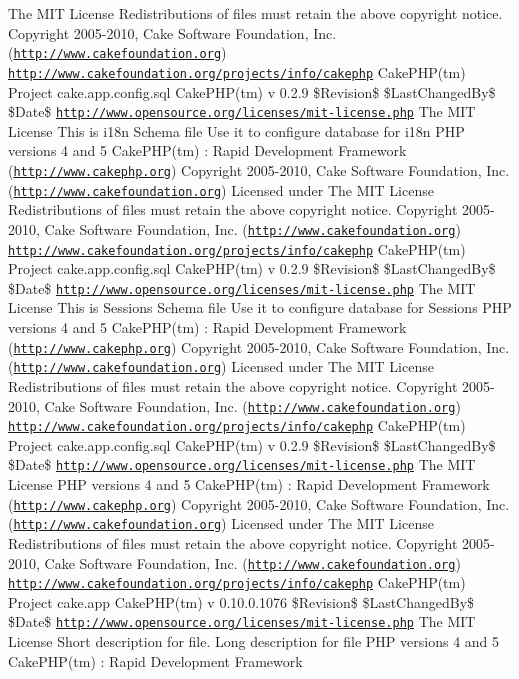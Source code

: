 The MIT License Redistributions of files must retain the above copyright notice.    Copyright 2005-\/2010, Cake Software Foundation, Inc. (\href{http://www.cakefoundation.org}{\tt http://www.cakefoundation.org})  \href{http://www.cakefoundation.org/projects/info/cakephp}{\tt http://www.cakefoundation.org/projects/info/cakephp} CakePHP(tm) Project   cake.app.config.sql  CakePHP(tm) v 0.2.9  \$Revision\$  \$LastChangedBy\$  \$Date\$  \href{http://www.opensource.org/licenses/mit-license.php}{\tt http://www.opensource.org/licenses/mit-\/license.php} The MIT License  This is i18n Schema file  Use it to configure database for i18n  PHP versions 4 and 5  CakePHP(tm) : Rapid Development Framework (\href{http://www.cakephp.org}{\tt http://www.cakephp.org}) Copyright 2005-\/2010, Cake Software Foundation, Inc. (\href{http://www.cakefoundation.org}{\tt http://www.cakefoundation.org})  Licensed under The MIT License Redistributions of files must retain the above copyright notice.    Copyright 2005-\/2010, Cake Software Foundation, Inc. (\href{http://www.cakefoundation.org}{\tt http://www.cakefoundation.org})  \href{http://www.cakefoundation.org/projects/info/cakephp}{\tt http://www.cakefoundation.org/projects/info/cakephp} CakePHP(tm) Project   cake.app.config.sql  CakePHP(tm) v 0.2.9  \$Revision\$  \$LastChangedBy\$  \$Date\$  \href{http://www.opensource.org/licenses/mit-license.php}{\tt http://www.opensource.org/licenses/mit-\/license.php} The MIT License  This is Sessions Schema file  Use it to configure database for Sessions  PHP versions 4 and 5  CakePHP(tm) : Rapid Development Framework (\href{http://www.cakephp.org}{\tt http://www.cakephp.org}) Copyright 2005-\/2010, Cake Software Foundation, Inc. (\href{http://www.cakefoundation.org}{\tt http://www.cakefoundation.org})  Licensed under The MIT License Redistributions of files must retain the above copyright notice.    Copyright 2005-\/2010, Cake Software Foundation, Inc. (\href{http://www.cakefoundation.org}{\tt http://www.cakefoundation.org})  \href{http://www.cakefoundation.org/projects/info/cakephp}{\tt http://www.cakefoundation.org/projects/info/cakephp} CakePHP(tm) Project   cake.app.config.sql  CakePHP(tm) v 0.2.9  \$Revision\$  \$LastChangedBy\$  \$Date\$  \href{http://www.opensource.org/licenses/mit-license.php}{\tt http://www.opensource.org/licenses/mit-\/license.php} The MIT License  PHP versions 4 and 5  CakePHP(tm) : Rapid Development Framework (\href{http://www.cakephp.org}{\tt http://www.cakephp.org}) Copyright 2005-\/2010, Cake Software Foundation, Inc. (\href{http://www.cakefoundation.org}{\tt http://www.cakefoundation.org})  Licensed under The MIT License Redistributions of files must retain the above copyright notice.    Copyright 2005-\/2010, Cake Software Foundation, Inc. (\href{http://www.cakefoundation.org}{\tt http://www.cakefoundation.org})  \href{http://www.cakefoundation.org/projects/info/cakephp}{\tt http://www.cakefoundation.org/projects/info/cakephp} CakePHP(tm) Project   cake.app  CakePHP(tm) v 0.10.0.1076  \$Revision\$  \$LastChangedBy\$  \$Date\$  \href{http://www.opensource.org/licenses/mit-license.php}{\tt http://www.opensource.org/licenses/mit-\/license.php} The MIT License  Short description for file.  Long description for file  PHP versions 4 and 5  CakePHP(tm) : Rapid Development Framework 